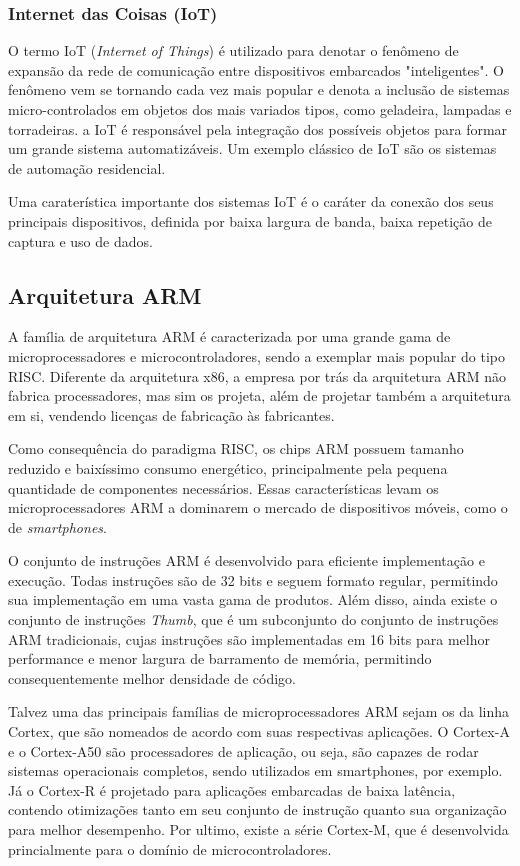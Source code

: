 \documentclass{article}
\begin{document}
\subsubsection{Internet das Coisas (IoT)}
O termo IoT (\textit{Internet of Things}) é utilizado para denotar o fenômeno de
expansão da rede de comunicação entre dispositivos embarcados "inteligentes". O
fenômeno vem se tornando cada vez mais popular e denota a inclusão de sistemas
micro-controlados em objetos dos mais variados tipos, como geladeira, lampadas e
torradeiras. a IoT é responsável pela integração dos possíveis objetos para
formar um grande sistema automatizáveis. Um exemplo clássico de IoT são os
sistemas de automação residencial.

Uma caraterística importante dos sistemas IoT é o caráter da conexão dos seus
principais dispositivos, definida por baixa largura de banda, baixa repetição de
captura e uso de dados.

\subsection{Arquitetura ARM} 
A família de arquitetura ARM é caracterizada por uma grande gama de
microprocessadores e microcontroladores, sendo a exemplar mais popular do tipo
RISC. Diferente da arquitetura x86, a empresa por trás da arquitetura ARM não
fabrica processadores, mas sim os projeta, além de projetar também a arquitetura
em si, vendendo licenças de fabricação às fabricantes.

Como consequência do paradigma RISC, os chips ARM possuem tamanho reduzido e
baixíssimo consumo energético, principalmente pela pequena quantidade de
componentes necessários. Essas características levam os microprocessadores ARM a
dominarem o mercado de dispositivos móveis, como o de \textit{smartphones}.

O conjunto de instruções ARM é desenvolvido para eficiente implementação e
execução. Todas instruções são de 32 bits e seguem formato regular, permitindo
sua implementação em uma vasta gama de produtos. Além disso, ainda existe o
conjunto de instruções \textit{Thumb}, que é um subconjunto do conjunto de
instruções ARM tradicionais, cujas instruções são implementadas em 16 bits para
melhor performance e menor largura de barramento de memória, permitindo
consequentemente melhor densidade de código.

Talvez uma das principais famílias de microprocessadores ARM sejam os da linha
Cortex, que são nomeados de acordo com suas respectivas aplicações. O Cortex-A
e o Cortex-A50 são processadores de aplicação, ou seja, são capazes de rodar sistemas
operacionais completos, sendo utilizados em smartphones, por exemplo. Já o
Cortex-R é projetado para aplicações embarcadas de baixa latência, contendo
otimizações tanto em seu conjunto de instrução quanto sua organização para
melhor desempenho. Por ultimo, existe a série Cortex-M, que é desenvolvida
princialmente para o domínio de microcontroladores.
\end{document}
